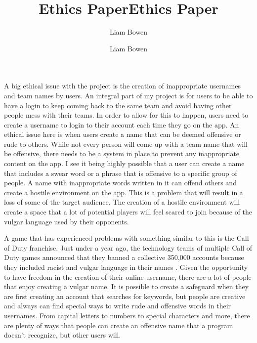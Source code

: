 \documentclass[12pt, twocolumn]{article}
\title{Ethics Paper}
\author{Liam Bowen}
\begin{document}
\title{Ethics Paper}
\author{Liam Bowen}

\maketitle

A big ethical issue with the project is the creation of inappropriate usernames and team names by users. An integral part of my project is for users to be able to have a login to keep coming back to the same team and avoid having other people mess with their teams. In order to allow for this to happen, users need to create a username to login to their account each time they go on the app. An ethical issue here is when users create a name that can be deemed offensive or rude to others. While not every person will come up with a team name that will be offensive, there needs to be a system in place to prevent any inappropriate content on the app. I see it being highly possible that a user can create a name that includes a swear word or a phrase that is offensive to a specific group of people. A name with inappropriate words written in it can offend others and create a hostile environment on the app. This is a problem that will result in a loss of some of the target audience. The creation of a hostile environment will create a space that a lot of potential players will feel scared to join because of the vulgar language used by their opponents. 

A game that has experienced problems with something similar to this is the Call of Duty franchise. Just under a year ago, the technology teams of multiple Call of Duty games announced that they banned a collective 350,000 accounts because they included racist and vulgar language in their names \cite{Staff}. Given the opportunity to have freedom in the creation of their online username, there are a lot of people that enjoy creating a vulgar name. It is possible to create a safeguard when they are first creating an account that searches for keywords, but people are creative and always can find special ways to write rude and offensive words in their usernames. From capital letters to numbers to special characters and more, there are plenty of ways that people can create an offensive name that a program doesn’t recognize, but other users will. 
\end{document}
